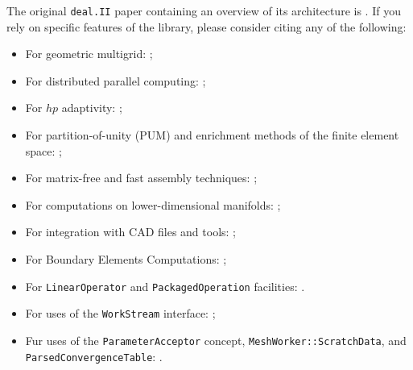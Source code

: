 \documentclass{ansarticle-preprint}
\newcommand{\specialword}[1]{\texttt{#1}}
\newcommand{\dealii}{{\specialword{deal.II}}\xspace}
\begin{document}
The original \texttt{\dealii} paper containing an overview of its
architecture is \cite{BangerthHartmannKanschat2007}. If you rely on
specific features of the library, please consider citing any of the
following:
\begin{itemize}
 \item For geometric multigrid: \cite{Kanschat2004,JanssenKanschat2011,ClevengerHeisterKanschatKronbichler2019};
 \item For distributed parallel computing: \cite{BangerthBursteddeHeisterKronbichler11};
 \item For $hp$ adaptivity: \cite{BangerthKayserHerold2007};
  \item For partition-of-unity (PUM) and enrichment methods of the
    finite element space: \cite{Davydov2016};
 \item For matrix-free and fast assembly techniques:
   \cite{KronbichlerKormann2012,KronbichlerKormann2019};
 \item For computations on lower-dimensional manifolds:
   \cite{DeSimoneHeltaiManigrasso2009};
 \item For integration with CAD files and tools:
   \cite{HeltaiMola2015};
 \item For Boundary Elements Computations:
   \cite{GiulianiMolaHeltai-2018-a};
 \item For \texttt{LinearOperator} and \texttt{PackagedOperation} facilities:
   \cite{MaierBardelloniHeltai-2016-a,MaierBardelloniHeltai-2016-b}.
 \item For uses of the \texttt{WorkStream} interface:
   \cite{TKB16};
   \item Fur uses of the \texttt{ParameterAcceptor} concept,
     \texttt{MeshWorker::ScratchData}, and
     \texttt{ParsedConvergenceTable}: \cite{SartoriGiulianiBardelloni-2018-a}.
\end{itemize}
\end{document}
